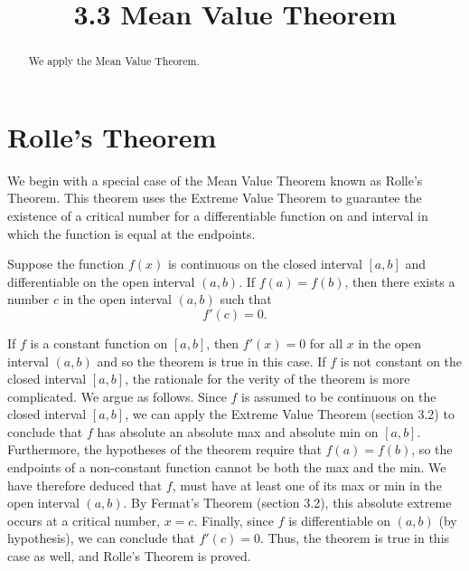\documentclass[handout]{ximera}
\title{3.3 Mean Value Theorem}
\begin{document}
\begin{abstract}
We apply the Mean Value Theorem.
\end{abstract}

\maketitle


\section{Rolle's Theorem}

We begin with a special case of the Mean Value Theorem known as Rolle's Theorem.
This theorem uses the Extreme Value Theorem to guarantee the existence of a critical number for a differentiable 
function on and interval in which the function is equal at the endpoints.

\begin{theorem}
Suppose the function $f(x)$ is continuous on the closed interval $[a,b]$ and differentiable on the open interval $(a,b)$.
If $f(a) = f(b)$, then there exists a number $c$ in the open interval $(a,b)$ such that 
\[
f'(c) = 0.
\]
\end{theorem}

\begin{image}
\end{image}
If $f$ is a constant function on $[a,b]$, then $f'(x)= 0$ for all $x$ in the open interval $(a,b)$ and so the theorem is true in this case.
If $f$ is not constant on the closed interval $[a,b]$, the rationale for the verity of the theorem is more complicated.
We argue as follows.
Since $f$ is assumed to be continuous on the closed interval $[a,b]$, we can apply the Extreme Value Theorem (section 3.2) to conclude
that $f$ has absolute an absolute max and absolute min on $[a,b]$.
Furthermore, the hypotheses of the theorem require that $f(a) = f(b)$, so the endpoints of a non-constant function cannot be both the max and the min.
We have therefore deduced that 
$f$, must have at least one of its max or min in the open interval $(a,b)$.
By Fermat's Theorem (section 3.2), this absolute extreme occurs at a critical number, $x= c$. 
Finally, since $f$ is differentiable on $(a,b)$ (by hypothesis), we can conclude 
that $f'(c) = 0$. 
Thus, the theorem is true in this case as well, and Rolle's Theorem is proved.
\end{document}
